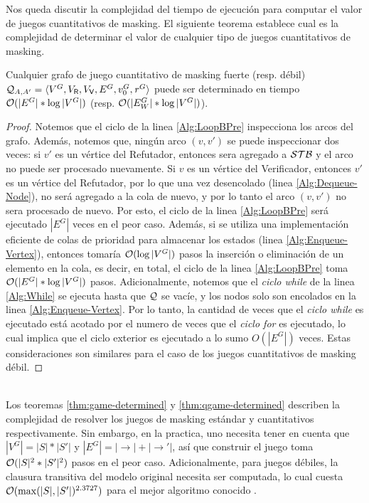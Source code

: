 Nos queda discutir la complejidad del tiempo de ejecución para computar el valor de juegos cuantitativos de masking. 
El siguiente teorema establece cual es la complejidad de determinar el valor de cualquier tipo de juegos cuantitativos de masking.
%
\sloppy \begin{theorem}\label{thm:qgame-determined} Cualquier grafo de juego cuantitativo de masking fuerte (resp. débil) 
$\mathcal{Q}_{A, A'} = \langle V^G, V_{\mathsf{R}}, V_{\mathsf{V}}, E^G, v_0^G, \mathit{r}^G \rangle$ puede ser determinado en tiempo $\mathcal{O}(|E^G|*\log |V^G|)$ (resp. $\mathcal{O}(|E_W^G|*\log |V^G|)$).
\end{theorem}
\begin{proof}
Notemos que el ciclo de la linea \ref{Alg:LoopBPre} inspecciona los arcos del grafo. Además, notemos que, ningún arco $(v, v')$ se puede inspeccionar dos veces:
si $v'$ es un vértice del Refutador, entonces sera agregado a $\mathcal{STB}$ y el arco no puede ser procesado nuevamente. 
Si $v$ es un vértice del Verificador, entonces $v'$ es un vértice del Refutador, por lo que una vez desencolado (linea \ref{Alg:Dequeue-Node}), no será agregado a la cola de nuevo, y por lo tanto el arco $(v, v')$ no sera procesado de nuevo. Por esto, el ciclo de la linea \ref{Alg:LoopBPre} será ejecutado $|E^G|$ veces en el peor caso. 
Además, si se utiliza una implementación eficiente de colas de prioridad para almacenar los estados (linea \ref{Alg:Enqueue-Vertex}), entonces tomaría $\mathcal{O}(\log |V^G|)$ pasos la inserción o eliminación de un elemento en la cola, es decir, en total, el ciclo de la linea \ref{Alg:LoopBPre} toma $\mathcal{O}(|E^G|*\log |V^G|)$ pasos.
Adicionalmente, notemos que el \emph{ciclo while} de la linea \ref{Alg:While} se ejecuta hasta que $\mathcal{Q}$ se vacíe, y los nodos solo son encolados en la linea \ref{Alg:Enqueue-Vertex}. Por lo tanto, la cantidad de veces que el \emph{ciclo while} es ejecutado está acotado por el numero de veces que el \emph{ciclo for} es ejecutado, lo cual implica que el ciclo exterior es ejecutado a lo sumo $O(|E^G|)$ veces. Estas consideraciones son similares para el caso de los juegos cuantitativos de masking débil.	

\qedhere
\end{proof} \\

Los teoremas \ref{thm:game-determined} y \ref{thm:qgame-determined} describen la complejidad de resolver los juegos de masking estándar y cuantitativos respectivamente. Sin embargo, en la practica, uno necesita tener en cuenta que $|V^G| = |S|*|S'|$ y $|E^G| = |{\rightarrow}|+|{\rightarrow'}|$, así que construir el juego toma 
$\mathcal{O}(|S|^2*|S'|^2)$ pasos en el peor caso. Adicionalmente, para juegos débiles, la clausura transitiva del modelo original necesita ser computada, lo cual cuesta $\mathcal{O}(\max(|S|,|S'|)^{2.3727})$ para el mejor algoritmo conocido \cite{Wil12}.

